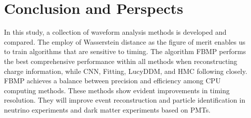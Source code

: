 \section{Conclusion and Perspects} %
\label{sec:conclusion}

In this study, a collection of waveform analysis methods is developed and compared. The employ of Wasserstein distance as the figure of merit enables us to train algorithms that are sensitive to timing. The algorithm FBMP performs the best comprehensive performance within all methods when reconstructing charge information, while CNN, Fitting, LucyDDM, and HMC following closely. FBMP achieves a balance between precision and efficiency among CPU computing methods. These methods show evident improvements in timing resolution. They will improve event reconstruction and particle identification in neutrino experiments and dark matter experiments based on PMTs. 

